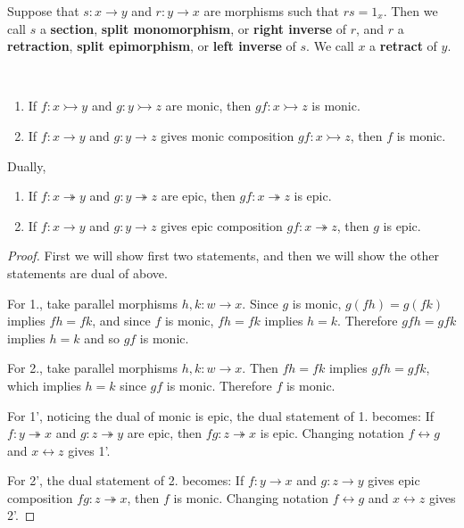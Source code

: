 \begin{defn} Suppose that $s:x\rightarrow y$ and $r:y\rightarrow x$ are morphisms such that $rs=1_x$. Then we call $s$ a \textbf{section}, \textbf{split monomorphism}, or \textbf{right inverse} of $r$, and $r$ a \textbf{retraction}, \textbf{split epimorphism}, or \textbf{left inverse} of $s$. We call $x$ a \textbf{retract} of $y$.
\end{defn}

\begin{lemma}
~\begin{enumerate}
\item If $f:x \rightarrowtail y$ and $g:y \rightarrowtail z$ are monic, then $gf:x\rightarrowtail z$ is monic.
\item If $f:x\rightarrow y$ and $g:y\rightarrow z$ gives monic composition $gf:x\rightarrowtail z$, then $f$ is monic.
\end{enumerate}
Dually,
\begin{enumerate}[label=\arabic*']
\item If $f:x\twoheadrightarrow y$ and $g:y\twoheadrightarrow z$ are epic, then $gf:x\twoheadrightarrow z$ is epic.
\item If $f:x\rightarrow y$ and $g:y\rightarrow z$ gives epic composition $gf:x\twoheadrightarrow z$, then $g$ is epic.
\end{enumerate}
\end{lemma}
\begin{proof}
First we will show first two statements, and then we will show the other statements are dual of above.

For 1., take parallel morphisms $h,k:w\rightarrow x$. Since $g$ is monic, $g(fh)=g(fk)$ implies $fh=fk$, and since $f$ is monic, $fh=fk$ implies $h=k$. Therefore $gfh=gfk$ implies $h=k$ and so $gf$ is monic.

For 2., take parallel morphisms $h,k:w\rightarrow x$. Then $fh=fk$ implies $gfh=gfk$, which implies $h=k$ since $gf$ is monic. Therefore $f$ is monic.

For 1', noticing the dual of monic is epic, the dual statement of 1. becomes: If $f:y\twoheadrightarrow x$ and $g:z\twoheadrightarrow y$ are epic, then $fg:z\twoheadrightarrow x$ is epic. Changing notation $f\leftrightarrow g$ and $x\leftrightarrow z$ gives 1'.

For 2', the dual statement of 2. becomes: If $f:y\rightarrow x$ and $g:z\rightarrow y$ gives epic composition $fg:z\twoheadrightarrow x$, then $f$ is monic. Changing notation $f\leftrightarrow g$ and $x\leftrightarrow z$ gives 2'.
\end{proof}

